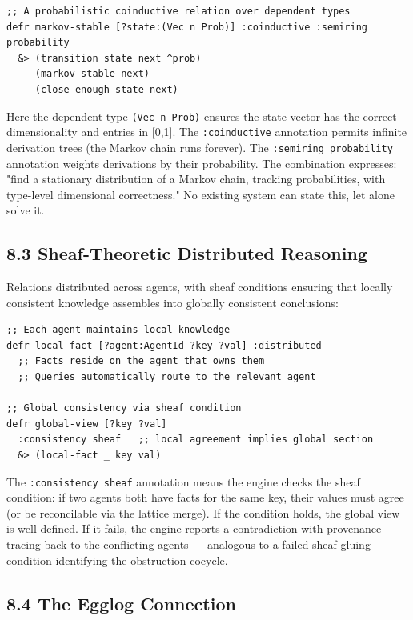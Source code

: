 \documentclass[11pt]{article}
\begin{document}
\begin{verbatim}
;; A probabilistic coinductive relation over dependent types
defr markov-stable [?state:(Vec n Prob)] :coinductive :semiring probability
  &> (transition state next ^prob)
     (markov-stable next)
     (close-enough state next)
\end{verbatim}

Here the dependent type \texttt{(Vec n Prob)} ensures the state vector has the correct dimensionality and entries in [0,1]. The \texttt{:coinductive} annotation permits infinite derivation trees (the Markov chain runs forever). The \texttt{:semiring probability} annotation weights derivations by their probability. The combination expresses: "find a stationary distribution of a Markov chain, tracking probabilities, with type-level dimensional correctness." No existing system can state this, let alone solve it.
\subsection{8.3 Sheaf-Theoretic Distributed Reasoning}
\label{sec:org13855f1}

Relations distributed across agents, with sheaf conditions ensuring that locally consistent knowledge assembles into globally consistent conclusions:

\begin{verbatim}
;; Each agent maintains local knowledge
defr local-fact [?agent:AgentId ?key ?val] :distributed
  ;; Facts reside on the agent that owns them
  ;; Queries automatically route to the relevant agent

;; Global consistency via sheaf condition
defr global-view [?key ?val]
  :consistency sheaf   ;; local agreement implies global section
  &> (local-fact _ key val)
\end{verbatim}

The \texttt{:consistency sheaf} annotation means the engine checks the sheaf condition: if two agents both have facts for the same key, their values must agree (or be reconcilable via the lattice merge). If the condition holds, the global view is well-defined. If it fails, the engine reports a contradiction with provenance tracing back to the conflicting agents --- analogous to a failed sheaf gluing condition identifying the obstruction cocycle.
\subsection{8.4 The Egglog Connection}
\label{sec:org13b2f67}
\end{document}
